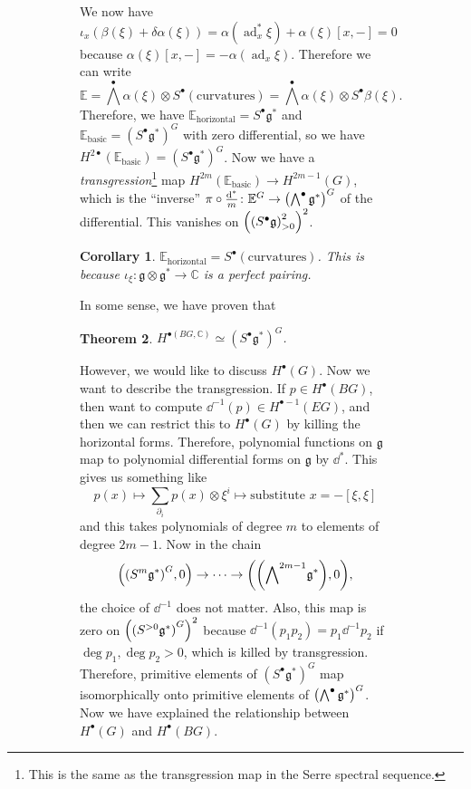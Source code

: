\documentclass[leqno, openany]{memoir}
\newtheorem{thm}{Theorem}[section]
\newtheorem{cor}[thm]{Corollary}
\theoremstyle{definition}
\theoremstyle{remark}
\theoremstyle{plain}
\theoremstyle{definition}
\theoremstyle{remark}
\newcommand{\C}{\mathbb{C}}
\newcommand{\E}{\mathbb{E}}
\newcommand{\mf}[1]{\mathfrak{#1}}
\DeclareMathOperator{\ad}{ad}
\begin{document}
\begin{figure}[H]
\begin{figure}[H]
We now have \[ \iota_x (\beta(\xi) + \delta \alpha(\xi)) = \alpha(\ad_x^* \xi)
    + \alpha(\xi) [x,-] = 0 \] because $\alpha(\xi)[x,-] = -\alpha(\ad_x \xi)$.
    Therefore we can write \[ \E = {\bigwedge}^{\bullet} \alpha(\xi) \otimes
    S^{\bullet}(\text{curvatures}) = {\bigwedge}^{\bullet} \alpha(\xi) \otimes
S^{\bullet} \beta(\xi). \] Therefore, we have $\E_{\text{horizontal}} =
S^{\bullet} \mf{g}^*$ and $\E_{\text{basic}} = {(S^{\bullet} \mf{g}^*)}^G$ with
zero differential, so we have $H^{2 \bullet}(\E_{\text{basic}}) = {(S^{\bullet}
\mf{g}^*)}^G$. Now we have a \textit{transgression}\footnote{This is the same
as the transgression map in the Serre spectral sequence.} map $H^{2
m}(\E_{\text{basic}}) \to H^{2 m-1}(G)$, which is the ``inverse'' $\pi \circ
\frac{\dd^*}{m} \colon \E^G \to { \qty( \bigwedge^{\bullet} \mf{g}^* ) }^G$ of
the differential. This vanishes on ${ \qty( { ( S^{\bullet} \mf{g} ) }^2_{>0} )
}^2$.

\begin{cor} $\E_{\text{horizontal}} = S^{\bullet}(\text{curvatures})$. This is
because $\iota_{\xi} \colon \mf{g} \otimes \mf{g}^* \to \C$ is a perfect
pairing.  \end{cor}

In some sense, we have proven that \begin{thm} $H^{\bullet(BG, \C)} \simeq
{(S^{\bullet} \mf{g}^*)}^G$.  \end{thm}

However, we would like to discuss $H^{\bullet}(G)$. Now we want to describe the
transgression. If $p \in H^{\bullet}(BG)$, then want to compute $\dd^{-1}(p)
\in H^{\bullet - 1}(EG)$, and then we can restrict this to $H^{\bullet}(G)$ by
killing the horizontal forms. Therefore, polynomial functions on $\mf{g}$ map
to polynomial differential forms on $\mf{g}$ by $\dd^*$. This gives us
something like \[ p(x) \mapsto \sum_{\partial_i} p(x) \otimes \xi^i \mapsto
\text{substitute $x = -[\xi, \xi]$} \] and this takes polynomials of degree $m$
to elements of degree $2m-1$. Now in the chain \[ \qty( {(S^m\mf{g}^*)}^G, 0 )
\to \cdots \to \qty(\qty({\bigwedge}^{2m-1} \mf{g}^*), 0), \] the choice of
$\dd^{-1}$ does not matter. Also, this map is zero on ${\qty({(S^{>0}
\mf{g}^*)}^G)}^2$ because $\dd^{-1} (p_1p_2) = p_1 \dd^{-1}p_2$ if $\deg p_1,
\deg p_2 > 0$, which is killed by transgression. Therefore, primitive elements
of ${(S^{\bullet}\mf{g}^*)}^G$ map isomorphically onto primitive elements of
${\qty(\bigwedge^{\bullet} \mf{g}^*)}^G$. Now we have explained the
relationship between $H^{\bullet}(G)$ and $H^{\bullet}(BG)$. 


\end{figure}
\end{figure}
\end{document}
